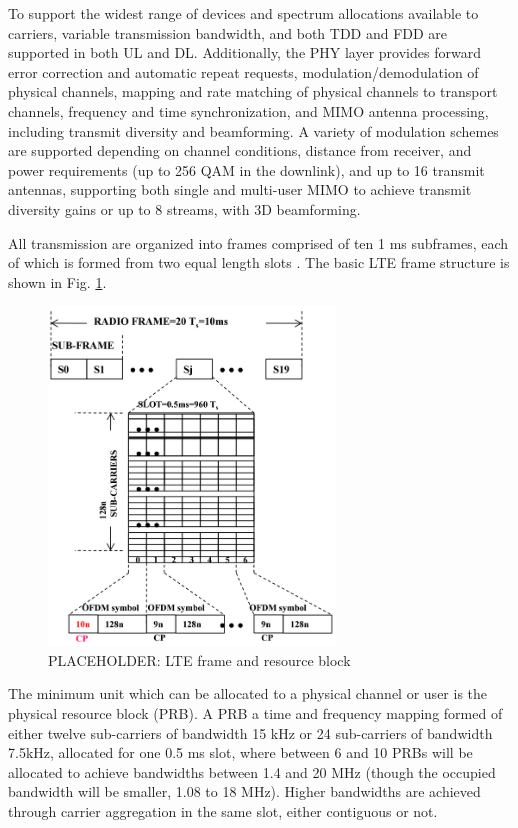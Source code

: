 To support the widest range of devices and spectrum allocations available to carriers, variable transmission bandwidth, and both TDD and FDD are supported in both UL and DL. Additionally, the PHY layer provides forward error correction and automatic repeat requests, modulation/demodulation of physical channels, mapping and rate matching of physical channels to transport channels, frequency and time synchronization, and MIMO antenna processing, including transmit diversity and beamforming.  A variety of modulation schemes are supported depending on channel conditions, distance from receiver, and power requirements (up to 256 QAM in the downlink), and up to 16 transmit antennas, supporting both single and multi-user MIMO to achieve transmit diversity gains or up to 8 streams, with 3D beamforming.


All transmission are organized into frames comprised of ten 1 ms subframes, each of which is formed from two equal length slots \cite{tr36211}. The basic LTE frame structure is shown in Fig. \ref{lte:frame}.
\begin{figure}[!t]
	\centering
	\includegraphics[width=3in]{figures3/lte-frame}
	\caption{PLACEHOLDER: LTE frame and resource block}
	\label{lte:frame}
\end{figure}
The minimum unit which can be allocated to a physical channel or user is the physical resource block (PRB).  A PRB a time and frequency mapping formed of either twelve sub-carriers of bandwidth 15 kHz or 24 sub-carriers of bandwidth 7.5kHz, allocated for one 0.5 ms slot, where between 6 and 10 PRBs will be allocated to achieve bandwidths between 1.4 and 20 MHz (though the occupied bandwidth will be smaller, 1.08 to 18 MHz).  Higher bandwidths are achieved through carrier aggregation in the same slot, either contiguous or not.  

